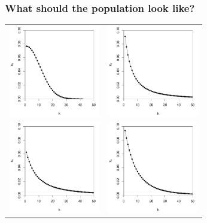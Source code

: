 \documentclass[t]{beamer} %
\begin{document}
\begin{frame}
  \frametitle{What should the population look like?}
  
  \ungap[1.5]
  \begin{center}
    \begin{tabular}{cc}
      \includegraphics[width=40mm]{img/05-models-normal} &
      \includegraphics[width=40mm]{img/05-models-zm-1} \\
      \includegraphics[width=40mm]{img/05-models-zm-3} &
      \includegraphics[width=40mm]{img/05-models-zm-2}
    \end{tabular}
  \end{center}
\end{frame}
\end{document}
